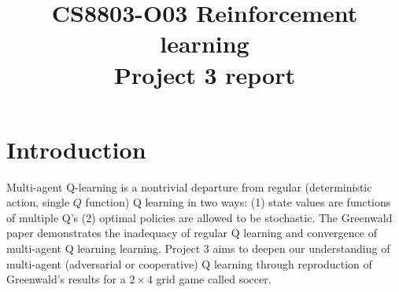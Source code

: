 \documentclass[conference]{IEEEtran}
\begin{document}
\title{CS8803-O03 Reinforcement learning\\Project 3 report}

\author{
}
\maketitle


\IEEEpeerreviewmaketitle
\section{Introduction}
Multi-agent Q-learning is a nontrivial departure from regular (deterministic action, single $Q$ function) Q learning in two ways: (1) state values are functions of multiple Q's (2) optimal policies are allowed to be stochastic. The Greenwald paper \cite{greenwald} demonstrates the inadequacy of regular Q learning and convergence of multi-agent Q learning learning. Project 3 aims to deepen our understanding of multi-agent (adversarial or cooperative) Q learning through reproduction of Greenwald's results for a $2\times4$ grid game called soccer.

\end{document}
